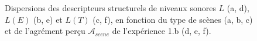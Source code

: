 \begin{figure}[t]
       \caption{Dispersions des descripteurs structurels de niveaux sonores $L$ (a, d), $L(E)$ (b, e) et $L(T)$ (c, f), en fonction du type de scènes (a, b, c) et de l'agrément perçu $\mathcal{A}_{scene}$ de l'expérience 1.b (d, e, f).}\label{fig:soundlevel}
\end{figure}


